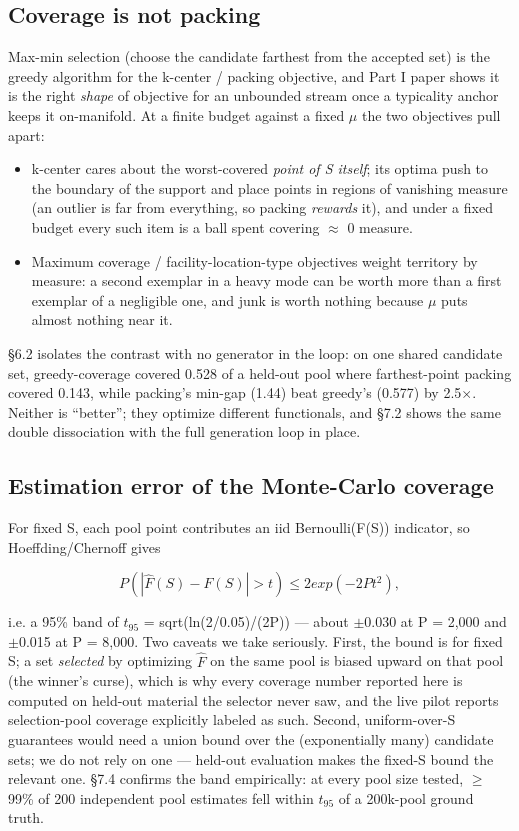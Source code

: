 \documentclass[11pt]{article}
\theoremstyle{plain}
\theoremstyle{definition}
\begin{document}
\subsection{Coverage is not packing}
Max-min selection (choose the candidate farthest from the accepted set) is the greedy algorithm for the k-center / packing objective, and Part I paper shows it is the right \emph{shape} of objective for an unbounded stream once a typicality anchor keeps it on-manifold. At a finite budget against a fixed $\mu$ the two objectives pull apart:

\begin{itemize}
  \item k-center cares about the worst-covered \emph{point of S itself}; its optima push to the boundary of the support and place points in regions of vanishing measure (an outlier is far from everything, so packing \emph{rewards} it), and under a fixed budget every such item is a ball spent covering $\approx$ 0 measure.
  \item Maximum coverage / facility-location-type objectives weight territory by measure: a second exemplar in a heavy mode can be worth more than a first exemplar of a negligible one, and junk is worth nothing because $\mu$ puts almost nothing near it.
\end{itemize}

\S{}6.2 isolates the contrast with no generator in the loop: on one shared candidate set, greedy-coverage covered 0.528 of a held-out pool where farthest-point packing covered 0.143, while packing's min-gap (1.44) beat greedy's (0.577) by 2.5$\times$. Neither is ``better''; they optimize different functionals, and \S{}7.2 shows the same double dissociation with the full generation loop in place.

\subsection{Estimation error of the Monte-Carlo coverage}
For fixed S, each pool point contributes an iid Bernoulli(F(S)) indicator, so Hoeffding/Chernoff gives

\[
P( |\hat{F}(S) - F(S)| > t ) \leq  2 exp(-2 P t^{2}),
\]

i.e. a 95\% band of $t_{95}$ = sqrt(ln(2/0.05)/(2P)) --- about $\pm$0.030 at P = 2,000 and $\pm$0.015 at P = 8,000. Two caveats we take seriously. First, the bound is for fixed S; a set \emph{selected} by optimizing $\hat{F}$ on the same pool is biased upward on that pool (the winner's curse), which is why every coverage number reported here is computed on held-out material the selector never saw, and the live pilot reports selection-pool coverage explicitly labeled as such. Second, uniform-over-S guarantees would need a union bound over the (exponentially many) candidate sets; we do not rely on one --- held-out evaluation makes the fixed-S bound the relevant one. \S{}7.4 confirms the band empirically: at every pool size tested, $\geq$ 99\% of 200 independent pool estimates fell within $t_{95}$ of a 200k-pool ground truth.
\end{document}
